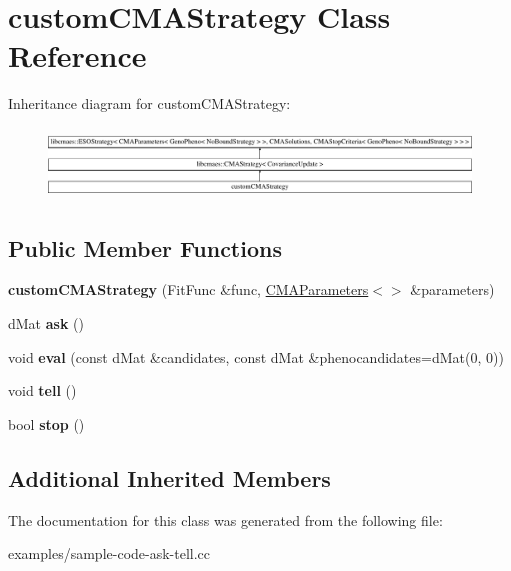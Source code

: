 \hypertarget{classcustomCMAStrategy}{\section{custom\-C\-M\-A\-Strategy Class Reference}
\label{classcustomCMAStrategy}
}
Inheritance diagram for custom\-C\-M\-A\-Strategy\-:\begin{figure}[H]
\begin{center}
\leavevmode
\includegraphics[height=1.898305cm]{classcustomCMAStrategy}
\end{center}
\end{figure}
\subsection*{Public Member Functions}
\begin{DoxyCompactItemize}
\item 
\hypertarget{classcustomCMAStrategy_a8d471b2aaca71aef766ce1030b20ae58}{{\bfseries custom\-C\-M\-A\-Strategy} (Fit\-Func \&func, \hyperlink{classlibcmaes_1_1CMAParameters}{C\-M\-A\-Parameters}$<$$>$ \&parameters)}\label{classcustomCMAStrategy_a8d471b2aaca71aef766ce1030b20ae58}

\item 
\hypertarget{classcustomCMAStrategy_a1c611a946b6252688edfc680ad2745c6}{d\-Mat {\bfseries ask} ()}\label{classcustomCMAStrategy_a1c611a946b6252688edfc680ad2745c6}

\item 
\hypertarget{classcustomCMAStrategy_ad88a47f2d2d7c01ad7196442181c61c3}{void {\bfseries eval} (const d\-Mat \&candidates, const d\-Mat \&phenocandidates=d\-Mat(0, 0))}\label{classcustomCMAStrategy_ad88a47f2d2d7c01ad7196442181c61c3}

\item 
\hypertarget{classcustomCMAStrategy_a45d116c8f308da33df7de95d8b0fc9a7}{void {\bfseries tell} ()}\label{classcustomCMAStrategy_a45d116c8f308da33df7de95d8b0fc9a7}

\item 
\hypertarget{classcustomCMAStrategy_ad600466db80f4a4692f66477529a457f}{bool {\bfseries stop} ()}\label{classcustomCMAStrategy_ad600466db80f4a4692f66477529a457f}

\end{DoxyCompactItemize}
\subsection*{Additional Inherited Members}


The documentation for this class was generated from the following file\-:\begin{DoxyCompactItemize}
\item 
examples/sample-\/code-\/ask-\/tell.\-cc\end{DoxyCompactItemize}
